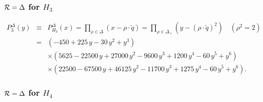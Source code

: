 \documentclass[a4paper,12pt]{article}
\begin{document}
\subsubsection{${\cal R}=\Delta$ for $H_3$}

\begin{eqnarray}
   P_{3}^{\Delta}(y)&\!\!\equiv\!\!&P_{H_3}^{\Delta}(x)=
   \prod_{\rho\in{\Delta}}\left(x-\rho\cdot\tilde{q}\right)
   =\prod_{\rho\in{\Delta_{+}}}\left(y-(\rho\cdot\tilde{q})^2\right)
   \quad (\rho^2=2)\nonumber\\
%
   &\!\!=\!\!&\left( -450 + 225\,y - 30\,y^2 + y^3 \right)\nonumber\\
   &&\times
    \left( 5625 - 22500\,y + 27000\,y^2 - 9600\,y^3 +
    1200\,y^4 - 60\,y^5 + y^6 \right)\nonumber\\
   && \times
    \left( 22500 - 67500\,y + 46125\,y^2 - 11700\,y^3 +
    1275\,y^4 - 60\,y^5 + y^6 \right).
\end{eqnarray}

\subsubsection{${\cal R}=\Delta$ for $H_4$}
\end{document}
